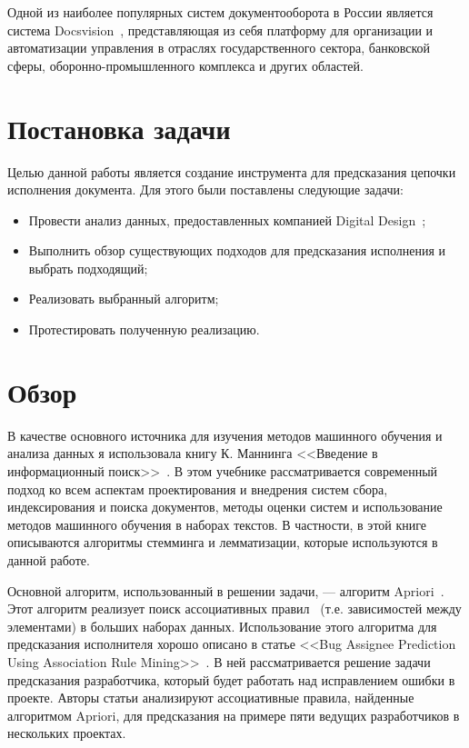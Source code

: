 \documentclass[14pt]{matmex-diploma-custom}
\begin{document}
Одной из наиболее популярных систем документооборота в России является система Docsvision~\cite{docsvision}, представляющая из себя платформу для организации и автоматизации управления в отраслях государственного сектора, банковской сферы, оборонно-промышленного комплекса и других областей.

\section{Постановка задачи}
Целью данной работы является создание инструмента для предсказания цепочки исполнения документа. Для этого были поставлены следующие задачи:
\begin{itemize}
    \item Провести анализ данных, предоставленных компанией Digital Design~\cite{digdes};
    \item Выполнить обзор существующих подходов для предсказания исполнения и выбрать подходящий;
    \item Реализовать выбранный алгоритм;
    \item Протестировать полученную реализацию.
\end{itemize}

\section{Обзор}
В качестве основного источника для изучения методов машинного обучения и анализа данных я использовала книгу К. Маннинга <<Введение в информационный поиск>>~\cite{Manning}. В этом учебнике рассматривается современный подход ко всем аспектам проектирования и внедрения систем сбора, индексирования и поиска документов, методы оценки систем и использование методов машинного обучения в наборах текстов. В частности, в этой книге описываются алгоритмы стемминга и лемматизации, которые используются в данной работе.

Основной алгоритм, использованный в решении задачи, --- алгоритм Apriori~\cite{apriori-algorithm}. Этот алгоритм реализует поиск ассоциативных правил~\cite{association-rule-first} (т.е. зависимостей между элементами) в больших наборах данных. Использование этого алгоритма для предсказания исполнителя хорошо описано в статье <<Bug Assignee Prediction Using Association Rule Mining>>~\cite{Sharma}. В ней рассматривается решение задачи предсказания разработчика, который будет работать над исправлением ошибки в проекте. Авторы статьи анализируют ассоциативные правила, найденные алгоритмом Apriori, для предсказания на примере пяти ведущих разработчиков в нескольких проектах.
\end{document}
